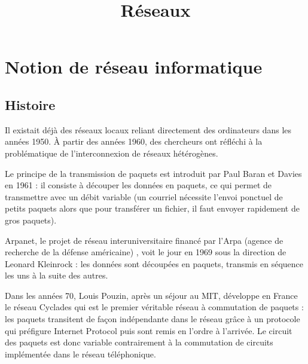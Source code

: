 \documentclass[a4paper,dvipsnames]{article}
\title{Réseaux}
\author{}
\date{}
\begin{document}
\renewcommand{\contentsname}{}

\pagestyle{fancy}

\begin{tcolorbox}[colframe=blue!75, colback=blue!45, valign=center, height=1.5cm, top=5mm]
  \maketitle
\end{tcolorbox}

\tableofcontents

\vspace{1cm}

\thispagestyle{fancy}

\section{Notion de réseau informatique}

\subsection{Histoire}

Il existait déjà des réseaux locaux reliant directement des ordinateurs dans les années 1950. À partir des années 1960, des chercheurs ont réfléchi à la problématique de l'interconnexion de réseaux hétérogènes.

\smallskip

Le principe de la {\color{red}transmission de paquets} est introduit par Paul Baran et Davies en 1961 : il consiste à découper les données en paquets, ce qui permet de transmettre avec un débit variable (un courriel nécessite l'envoi ponctuel de petits paquets alors que pour transférer un fichier, il faut envoyer rapidement de gros paquets).

\smallskip

{\color{red}Arpanet}, le projet de réseau interuniversitaire financé par l'Arpa (agence de recherche de la défense américaine) , voit le jour en 1969 sous la direction de Leonard Kleinrock : les données sont découpées en paquets, transmis en séquence les uns à la suite des autres.

\smallskip

Dans les années 70, Louis Pouzin, après un séjour au MIT, développe en France le réseau {\color{red}Cyclades} qui est le premier véritable réseau à {\color{red}commutation de paquets} : les paquets transitent de façon indépendante dans le réseau grâce à un protocole qui préfigure Internet Protocol puis sont remis en l'ordre à l'arrivée. Le circuit des paquets est donc variable contrairement à la {\color{red}commutation de circuits} implémentée dans le réseau téléphonique.
\end{document}
